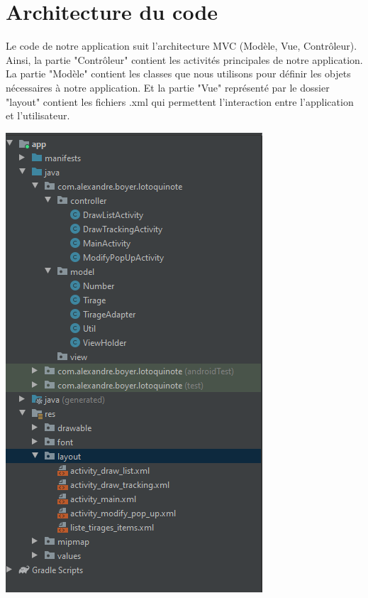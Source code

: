 \documentclass{article}
\begin{document}
    
    


\section{Architecture du code}


    \begin{minipage}{.6\textwidth}%
    Le code de notre application suit l'architecture MVC \newline (Modèle, Vue, Contrôleur).
    \vspace{1em}
    \newline Ainsi, la partie "Contrôleur" contient les activités principales de notre application.
    \vspace{1em}
    \newline La partie "Modèle" contient les classes que nous utilisons pour définir les objets nécessaires à notre application.
    \vspace{1em}
    \newline Et la partie "Vue" représenté par le dossier "layout" contient les fichiers .xml qui permettent l'interaction entre l'application et l'utilisateur. 
    \end{minipage}%
    \hfill
    \begin{minipage}{.35\textwidth}%
        \includegraphics[scale=0.6]{archiMVC.png}
    \end{minipage}%
\end{document}

